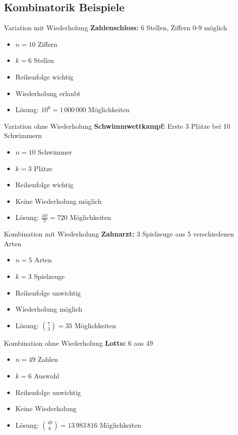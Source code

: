 \subsection{Kombinatorik Beispiele}

\begin{example2}{Variation mit Wiederholung}
\textbf{Zahlenschloss:} 6 Stellen, Ziffern 0-9 möglich
\begin{itemize}
    \item $n=10$ Ziffern
    \item $k=6$ Stellen
    \item Reihenfolge wichtig
    \item Wiederholung erlaubt
    \item Lösung: $10^6 = 1\,000\,000$ Möglichkeiten
\end{itemize}
\end{example2}

\begin{example2}{Variation ohne Wiederholung}
\textbf{Schwimmwettkampf:} Erste 3 Plätze bei 10 Schwimmern
\begin{itemize}
    \item $n=10$ Schwimmer
    \item $k=3$ Plätze
    \item Reihenfolge wichtig
    \item Keine Wiederholung möglich
    \item Lösung: $\frac{10!}{7!} = 720$ Möglichkeiten
\end{itemize}
\end{example2}

\begin{example2}{Kombination mit Wiederholung}
\textbf{Zahnarzt:} 3 Spielzeuge aus 5 verschiedenen Arten
\begin{itemize}
    \item $n=5$ Arten
    \item $k=3$ Spielzeuge
    \item Reihenfolge unwichtig
    \item Wiederholung möglich
    \item Lösung: $\binom{7}{3} = 35$ Möglichkeiten
\end{itemize}
\end{example2}

\begin{example2}{Kombination ohne Wiederholung}
\textbf{Lotto:} 6 aus 49
\begin{itemize}
    \item $n=49$ Zahlen
    \item $k=6$ Auswahl
    \item Reihenfolge unwichtig
    \item Keine Wiederholung
    \item Lösung: $\binom{49}{6} = 13\,983\,816$ Möglichkeiten
\end{itemize}
\end{example2}

